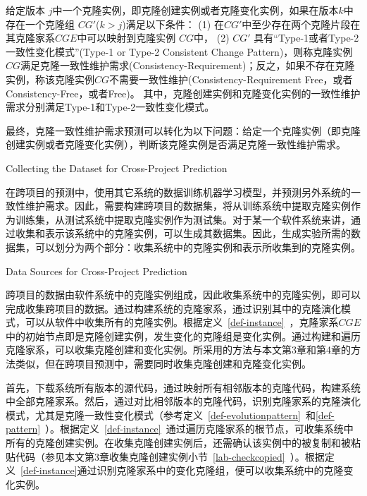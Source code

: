 \begin{definition}[克隆一致性维护需求] 
 \label{def-requirement}
给定版本 $j$中一个克隆实例，即克隆创建实例或者克隆变化实例，如果在版本$k$中存在一个克隆组 $CG'$($k>j$)满足以下条件： (1) 在$CG'$中至少存在两个克隆片段在其克隆家系$CGE$中可以映射到克隆实例 $CG$中， (2) $CG'$ 具有“Type-1或者Type-2一致性变化模式”(Type-1 or Type-2 Consistent Change Pattern)，则称克隆实例$CG$满足克隆一致性维护需求(Consistency-Requirement)；反之，如果不存在克隆实例，称该克隆实例$CG$不需要一致性维护(Consistency-Requirement Free，或者Consistency-Free，或者Free)。
其中，克隆创建实例和克隆变化实例的一致性维护需求分别满足Type-1和Type-2一致性变化模式。
\end{definition}

最终，克隆一致性维护需求预测可以转化为以下问题：给定一个克隆实例（即克隆创建实例或者克隆变化实例），判断该克隆实例是否满足克隆一致性维护需求。

{Collecting the Dataset for Cross-Project Prediction}

在跨项目的预测中，使用其它系统的数据训练机器学习模型，并预测另外系统的一致性维护需求。因此，需要构建跨项目的数据集，将从训练系统中提取克隆实例作为训练集，从测试系统中提取克隆实例作为测试集。对于某一个软件系统来讲，通过收集和表示该系统中的克隆实例，可以生成其数据集。因此，生成实验所需的数据集，可以划分为两个部分：收集系统中的克隆实例和表示所收集到的克隆实例。

{Data Sources for Cross-Project Prediction}

跨项目的数据由软件系统中的克隆实例组成，因此收集系统中的克隆实例，即可以完成收集跨项目的数据。通过构建系统的克隆家系，通过识别其中的克隆演化模式，可以从软件中收集所有的克隆实例。根据定义~\ref{def-instance}~，克隆家系$CGE$中的初始节点即是克隆创建实例，发生变化的克隆组是变化实例。通过构建和遍历克隆家系，可以收集克隆创建和变化实例。所采用的方法与本文第3章和第4章的方法类似，但在跨项目预测中，需要同时收集克隆创建和克隆变化实例。

首先，下载系统所有版本的源代码，通过映射所有相邻版本的克隆代码，构建系统中全部克隆家系。然后，通过对比相邻版本的克隆代码，识别克隆家系的克隆演化模式，尤其是克隆一致性变化模式（参考定义~\ref{def-evolutionpattern}~和\ref{def-pattern}~）。根据定义~\ref{def-instance}~通过遍历克隆家系的根节点，可收集系统中所有的克隆创建实例。在收集克隆创建实例后，还需确认该实例中的被复制和被粘贴代码（参见本文第3章收集克隆创建实例小节~\ref{lab-checkcopied}~）。根据定义~\ref{def-instance}通过识别克隆家系中的变化克隆组，便可以收集系统中的克隆变化实例。

